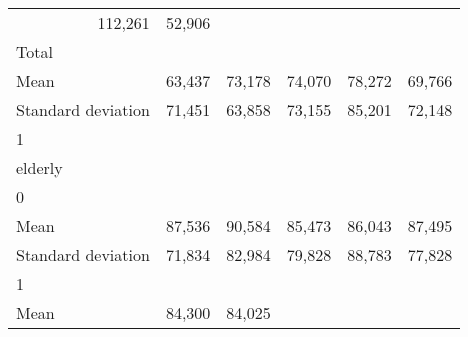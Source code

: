 \begin{tabular}{llllll}
  \multicolumn{1}{r}{112,261} &
  \multicolumn{1}{r}{52,906} \\
\multicolumn{1}{l}{\hspace{3em}Total} &
  \multicolumn{1}{|r}{} &
  \multicolumn{1}{r}{} &
  \multicolumn{1}{r}{} &
  \multicolumn{1}{r}{} &
  \multicolumn{1}{r}{} \\
\multicolumn{1}{l}{\hspace{4em}Mean} &
  \multicolumn{1}{|r}{63,437} &
  \multicolumn{1}{r}{73,178} &
  \multicolumn{1}{r}{74,070} &
  \multicolumn{1}{r}{78,272} &
  \multicolumn{1}{r}{69,766} \\
\multicolumn{1}{l}{\hspace{4em}Standard deviation} &
  \multicolumn{1}{|r}{71,451} &
  \multicolumn{1}{r}{63,858} &
  \multicolumn{1}{r}{73,155} &
  \multicolumn{1}{r}{85,201} &
  \multicolumn{1}{r}{72,148} \\
\multicolumn{1}{l}{\hspace{1em}1} &
  \multicolumn{1}{|r}{} &
  \multicolumn{1}{r}{} &
  \multicolumn{1}{r}{} &
  \multicolumn{1}{r}{} &
  \multicolumn{1}{r}{} \\
\multicolumn{1}{l}{\hspace{2em}elderly} &
  \multicolumn{1}{|r}{} &
  \multicolumn{1}{r}{} &
  \multicolumn{1}{r}{} &
  \multicolumn{1}{r}{} &
  \multicolumn{1}{r}{} \\
\multicolumn{1}{l}{\hspace{3em}0} &
  \multicolumn{1}{|r}{} &
  \multicolumn{1}{r}{} &
  \multicolumn{1}{r}{} &
  \multicolumn{1}{r}{} &
  \multicolumn{1}{r}{} \\
\multicolumn{1}{l}{\hspace{4em}Mean} &
  \multicolumn{1}{|r}{87,536} &
  \multicolumn{1}{r}{90,584} &
  \multicolumn{1}{r}{85,473} &
  \multicolumn{1}{r}{86,043} &
  \multicolumn{1}{r}{87,495} \\
\multicolumn{1}{l}{\hspace{4em}Standard deviation} &
  \multicolumn{1}{|r}{71,834} &
  \multicolumn{1}{r}{82,984} &
  \multicolumn{1}{r}{79,828} &
  \multicolumn{1}{r}{88,783} &
  \multicolumn{1}{r}{77,828} \\
\multicolumn{1}{l}{\hspace{3em}1} &
  \multicolumn{1}{|r}{} &
  \multicolumn{1}{r}{} &
  \multicolumn{1}{r}{} &
  \multicolumn{1}{r}{} &
  \multicolumn{1}{r}{} \\
\multicolumn{1}{l}{\hspace{4em}Mean} &
  \multicolumn{1}{|r}{84,300} &
  \multicolumn{1}{r}{84,025} &

\end{tabular}
